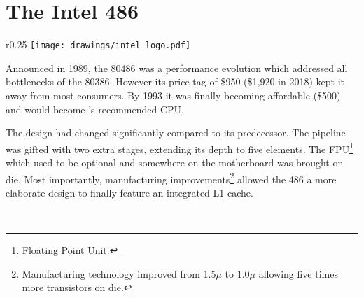 \section{The Intel 486}

\begin{wrapfigure}[5]{r}{0.25\textwidth}
\centering
\texttt{[image: drawings/intel\_logo.pdf]}
\end{wrapfigure}

Announced in 1989, the 80486 was a performance evolution which addressed all bottlenecks of the 80386. However its price tag of \$950 (\$1,920 in 2018) kept it away from most consumers. By 1993 it was finally becoming affordable (\$500) and would become \doom{}'s recommended CPU.\\
\par
The design had changed significantly compared to its predecessor. The pipeline was gifted with two extra stages, extending its depth to five elements. The FPU\footnote{Floating Point Unit.} which used to be optional and somewhere on the motherboard was brought on-die. Most importantly, manufacturing improvements\footnote{Manufacturing technology improved from 1.5$\mu$ to 1.0$\mu$ allowing five times more transistors on die.} allowed the 486 a more elaborate design to finally feature an integrated L1 cache.\\
\par
{}\\
\par


